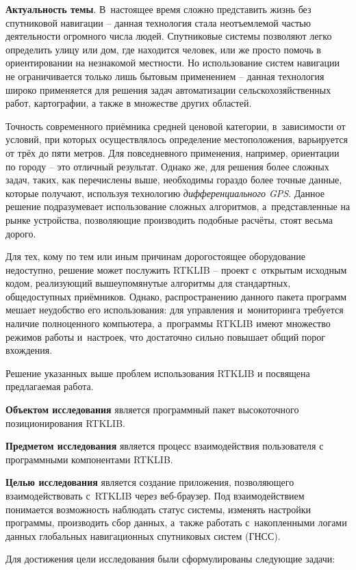 
\textbf{Актуальность темы}. В~настоящее время сложно представить жизнь без спутниковой навигации -- данная технология стала неотъемлемой частью деятельности огромного числа людей. Спутниковые системы позволяют легко определить улицу или дом, где находится человек, или же просто помочь в ориентировании на незнакомой местности. Но использование систем навигации не ограничивается только лишь бытовым применением -- данная технология широко применяется для решения задач автоматизации сельскохозяйственных работ, картографии, а также в множестве других областей. \par

Точность современного приёмника средней ценовой категории, в~зависимости от условий, при которых осуществлялось определение местоположения, варьируется от трёх до пяти метров. Для повседневного применения, например, ориентации по городу -- это отличный результат. Однако же, для решения более сложных задач, таких, как перечислены выше, необходимы гораздо более точные данные, которые получают, используя технологию \textit{дифференциального GPS}. Данное решение подразумевает использование сложных алгоритмов, а~представленные на рынке устройства, позволяющие производить подобные расчёты, стоят весьма дорого. \par

Для тех, кому по тем или иным причинам дорогостоящее оборудование недоступно, решение может послужить RTKLIB -- проект с~открытым исходным кодом, реализующий вышеупомянутые алгоритмы для стандартных, общедоступных приёмников. Однако, распространению данного пакета программ мешает неудобство его использования: для управления и~мониторинга требуется наличие полноценного компьютера, а~программы RTKLIB имеют множество режимов работы и~настроек, что достаточно сильно повышает общий порог вхождения. \par

Решение указанных выше проблем использования RTKLIB и посвящена предлагаемая работа. \par

\textbf{Объектом исследования} является программный пакет высокоточного позиционирования RTKLIB. \par

\textbf{Предметом исследования} является процесс взаимодействия пользователя с программными компонентами RTKLIB. \par

\textbf{Целью исследования} является создание приложения, позволяющего взаимодействовать с~RTKLIB через веб-браузер. Под взаимодействием понимается возможность наблюдать статус системы, изменять настройки программы, производить сбор данных, а~также работать с~накопленными логами данных глобальных навигационных спутниковых систем (ГНСС). \par

Для достижения цели исследования были сформулированы следующие задачи: